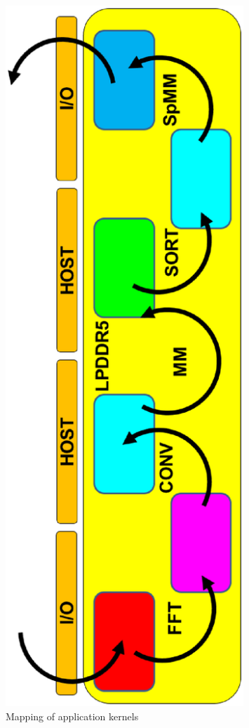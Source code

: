\begin{figure}[htbp]
\center
\includegraphics[angle=270,origin=b,width=0.80\textwidth]{fig11.eps}
\caption{\label{fig:map}Mapping of application kernels}
\end{figure}

